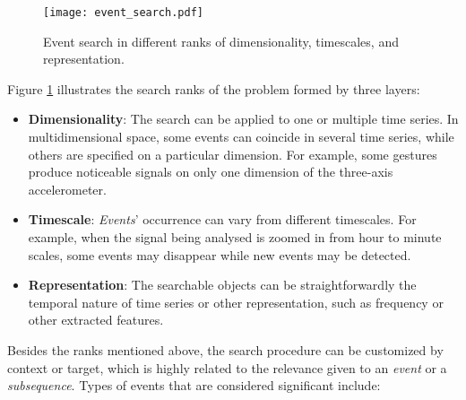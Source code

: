 \begin{figure}
    \centering
    \texttt{[image: event\_search.pdf]}
    \caption{Event search in different ranks of dimensionality, timescales, and representation.}
    \label{fig:event_search}
\end{figure}




Figure \ref{fig:event_search} illustrates the search ranks of the problem formed by three layers:

\begin{itemize}
    \item \textbf{Dimensionality}: The search can be applied to one or multiple time series. In multidimensional space, some events can coincide in several time series, while others are specified on a particular dimension. For example, some gestures produce noticeable signals on only one dimension of the three-axis accelerometer.
    \item \textbf{Timescale}: \textit{Events}' occurrence can vary from different timescales. For example, when the signal being analysed is zoomed in from hour to minute scales, some events may disappear while new events may be detected.
    \item \textbf{Representation}: The searchable objects can be straightforwardly the temporal nature of time series or other representation, such as frequency or other extracted features.
\end{itemize}

Besides the ranks mentioned above, the search procedure can be customized by context or target, which is highly related to the relevance given to an \textit{event} or a \textit{subsequence}. Types of events that are considered significant include:

